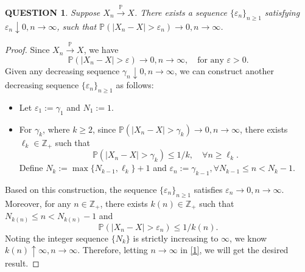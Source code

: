 \documentclass[12pt]{article}
\renewcommand{\(}{\left(}%
\renewcommand{\)}{\right)}%
\renewcommand{\[}{\left[}%
\renewcommand{\]}{\right]}%
\newcommand{\z}{\mathbb{Z}}
\newcommand{\p}{\mathbb{P}}
\newtheorem{question}{QUESTION}[section]}
\newtheorem{proof}{Proof.}}
\begin{document}
	\begin{question}
  	Suppose $X_n\overset{\p}{\to} X$. There exists a sequence $\{\varepsilon_n\}_{n\geq 1}$ satisfying $\varepsilon_n\downarrow 0,n\to\infty$, such that $\p(|X_n-X|>\varepsilon_n)\to0,n\to\infty$.
  \end{question}
  \begin{proof}
  	Since $X_n\overset{\p}{\to} X$, we have
  	\begin{equation*}
  		\p(|X_n-X|>\varepsilon)\to0,n\to\infty,\quad \text{for any }\varepsilon>0.
  	\end{equation*}
  	Given any decreasing sequence $\gamma_n\downarrow 0,n\to\infty$, we can construct another decreasing sequence $\{\varepsilon_n\}_{n\geq 1}$ as follows:
  	\begin{itemize}
  		\item Let $\varepsilon_1:=\gamma_1$ and $N_1:=1$.
  		\item For $\gamma_k$, where $k\geq 2$, since $\p(|X_n-X|>\gamma_k)\to0,n\to\infty$, there exists $\ell_k\in\z_+$ such that 
  		\begin{equation*}
  			\p(|X_n-X|>\gamma_k)\leq 1/k,\quad \forall n\geq \ell_k.
  		\end{equation*}
  		Define $N_k:=\max\{N_{k-1},\ell_k\}+1$ and $\varepsilon_n:=\gamma_{k-1},\forall N_{k-1}\leq n<N_k-1$.
  	\end{itemize}
  	
  	Based on this construction, the sequence $\{\varepsilon_n\}_{n\geq 1}$ satisfies $\varepsilon_n\to0,n\to\infty$. Moreover, for any $n\in\z_+$, there exists $k(n)\in\z_+$ such that $N_{k(n)}\leq n<N_{k(n)}-1$ and 
  	\begin{equation}\label{1}
  		\p(|X_n-X|>\varepsilon_n)\leq 1/k(n).
  	\end{equation}
  	Noting the integer sequence $\{N_k\}$ is strictly increasing to $\infty$, we know $k(n)\uparrow \infty,n\to\infty$. Therefore, letting $n\to\infty$ in \eqref{1}, we will get the desired result.
  	\end{proof}
  	
\end{document}
